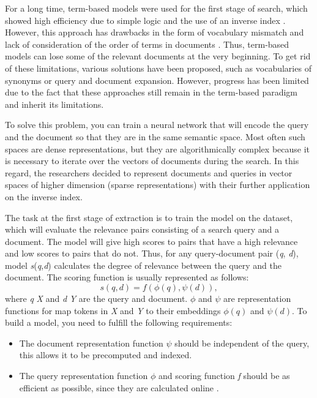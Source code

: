 \documentclass[
    twocolumn,
]{ceurart}
\begin{document}
    For a long time, term-based models were used for the first stage of search, which showed high
    efficiency due to simple logic and the use of an inverse index
    \cite{termBasedModelEfficiency1, termBasedModelEfficiency2}.
    However, this approach has drawbacks in the form of vocabulary mismatch
    \cite{vocabularyMismatch1, vocabularyMismatch2} and lack of consideration of the order of
    terms in documents \cite{ignoringTermOrdering}.
    Thus, term-based models can lose some of the relevant documents at the very beginning.
    To get rid of these limitations, various solutions have been proposed, such as vocabularies
    of synonyms or query \cite{queryExp1,queryExp2,queryExp3,queryExp4} and document
    \cite{docExp1, docExp2, docExp3} expansion.
    However, progress has been limited due to the fact that these approaches still remain in
    the term-based paradigm and inherit its limitations.

    To solve this problem, you can train a neural network that will encode the query and the
    document so that they are in the same semantic space. Most often such spaces are dense
    representations, but they are algorithmically complex because it is necessary to iterate over
    the vectors of documents during the search. In this regard, the researchers decided to
    represent documents and queries in vector spaces of higher dimension (sparse representations)
    with their further application on the inverse index.

    The task at the first stage of extraction is to train the model on the dataset, which will
    evaluate the relevance pairs consisting of a search query and a document.
    The model will give high scores to pairs that have a high relevance and low scores to
    pairs that do not.
    Thus, for any query-document pair (\emph{q}, \emph{d}), model \emph{s}(\emph{q},\emph{d})
    calculates the degree of relevance between the query and the document.
    The scoring function is usually represented as follows:
    \begin{equation}
        s(q,d) = f(\phi(q), \psi(d)),
    \end{equation}
    where \emph{q} \in \emph{X} and \emph{d} \in \emph{Y} are the query and document. $\phi$ and
    $\psi$ are representation functions for map tokens in \emph{X} and \emph{Y} to their
    embeddings $\phi(q)$ and $\psi(d)$.
    To build a model, you need to fulfill the following requirements:
    \begin{itemize}
        \item The document representation function $\psi$ should be independent of the query,
        this allows it to be precomputed and indexed.
        \item The query representation function $\phi$ and scoring function \emph{f} should be as
        efficient as possible, since they are calculated online \cite{SOTA}.
    \end{itemize}
\end{document}
